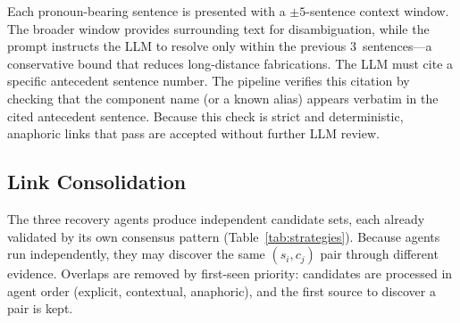 Each pronoun-bearing sentence is presented with a $\pm5$-sentence
context window.
The broader window provides surrounding text for disambiguation,
while the prompt instructs the LLM to resolve only within the
previous 3~sentences---a conservative bound that reduces
long-distance fabrications.
The LLM must cite a specific antecedent sentence number.
The pipeline verifies this citation by checking that the
component name (or a known alias) appears verbatim in the
cited antecedent sentence.
Because this check is strict and deterministic, anaphoric
links that pass are accepted without further LLM review.


\subsection{Link Consolidation}\label{sec:merge}

The three recovery agents produce independent candidate
sets, each already validated by its own consensus pattern
(Table~\ref{tab:strategies}).
Because agents run independently, they may discover the
same $(s_i, c_j)$ pair through different evidence.
Overlaps are removed by first-seen priority:
candidates are processed in agent order
(explicit, contextual, anaphoric),
and the first source to discover a pair is kept.
